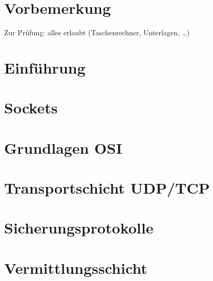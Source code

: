 \newcommand{\customDir}{../}








%
\setlength{\headheight}{10mm}	%



\maketitle
\newpage
\tableofcontents
\newpage

\chapter*{Vorbemerkung}

Zur Prüfung: alles erlaubt (Taschenrechner, Unterlagen, …)

\chapter{Einführung}
%

\chapter{Sockets}
%

\chapter{Grundlagen OSI}
%

\chapter{Transportschicht UDP/TCP}
%

\chapter{Sicherungsprotokolle}
%

\chapter{Vermittlungsschicht}
%





